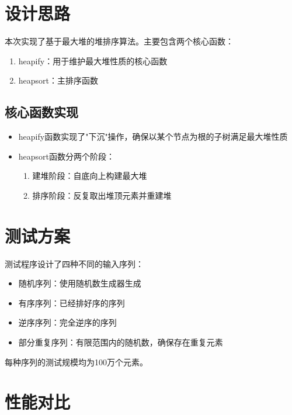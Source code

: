 \documentclass[UTF8]{ctexart}
\begin{document}
\pagestyle{fancy}
\fancyhead{}

\section{设计思路}

本次实现了基于最大堆的堆排序算法。主要包含两个核心函数：

\begin{enumerate}
    \item heapify：用于维护最大堆性质的核心函数
    \item heapsort：主排序函数
\end{enumerate}

\subsection{核心函数实现}

\begin{itemize}
    \item heapify函数实现了"下沉"操作，确保以某个节点为根的子树满足最大堆性质
    \item heapsort函数分两个阶段：
        \begin{enumerate}
            \item 建堆阶段：自底向上构建最大堆
            \item 排序阶段：反复取出堆顶元素并重建堆
        \end{enumerate}
\end{itemize}

\section{测试方案}

测试程序设计了四种不同的输入序列：
\begin{itemize}
    \item 随机序列：使用随机数生成器生成
    \item 有序序列：已经排好序的序列
    \item 逆序序列：完全逆序的序列
    \item 部分重复序列：有限范围内的随机数，确保存在重复元素
\end{itemize}

每种序列的测试规模均为100万个元素。

\section{性能对比}
\end{document}
